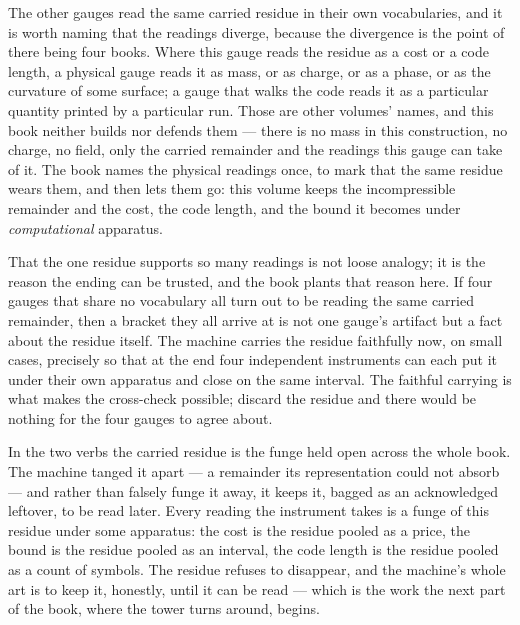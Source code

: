 The other gauges read the same carried residue in their own vocabularies, and it is worth naming that the readings
diverge, because the divergence is the point of there being four books. Where this gauge reads the residue as a cost or
a code length, a physical gauge reads it as mass, or as charge, or as a phase, or as the curvature of some surface; a
gauge that walks the code reads it as a particular quantity printed by a particular run. Those are other volumes'
names, and this book neither builds nor defends them --- there is no mass in this construction, no charge, no field,
only the carried remainder and the readings this gauge can take of it. The book names the physical readings once, to
mark that the same residue wears them, and then lets them go: this volume keeps the incompressible remainder and the
cost, the code length, and the bound it becomes under \emph{computational} apparatus.

That the one residue supports so many readings is not loose analogy; it is the reason the ending can be trusted, and
the book plants that reason here. If four gauges that share no vocabulary all turn out to be reading the same carried
remainder, then a bracket they all arrive at is not one gauge's artifact but a fact about the residue itself. The
machine carries the residue faithfully now, on small cases, precisely so that at the end four independent instruments
can each put it under their own apparatus and close on the same interval. The faithful carrying is what makes the
cross-check possible; discard the residue and there would be nothing for the four gauges to agree about.

In the two verbs the carried residue is the funge held open across the whole book. The machine tanged it apart --- a
remainder its representation could not absorb --- and rather than falsely funge it away, it keeps it, bagged as an
acknowledged leftover, to be read later. Every reading the instrument takes is a funge of this residue under some
apparatus: the cost is the residue pooled as a price, the bound is the residue pooled as an interval, the code length is
the residue pooled as a count of symbols. The residue refuses to disappear, and the machine's whole art is to keep it,
honestly, until it can be read --- which is the work the next part of the book, where the tower turns around, begins.
